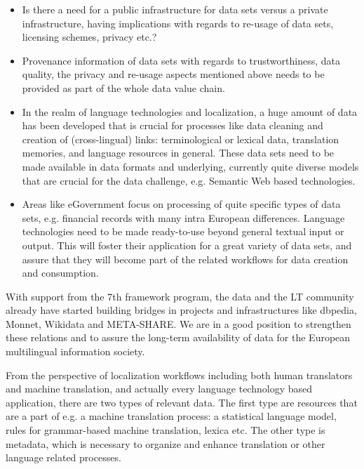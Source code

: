 \documentclass[10pt, plain]{../../metanetpaper}
\begin{document}
\begin{multicols}{2}
\begin{itemize}
\item Is there a need for a public infrastructure for data sets versus a private infrastructure, having implications with regards to re-usage of data sets, licensing schemes, privacy etc.?
\item Provenance information of data sets with regards to trustworthiness, data quality, the privacy and re-usage aspects mentioned above needs to be provided as part of the whole data value chain.
\item In the realm of language technologies and localization, a huge amount of data has been developed that is crucial for processes like data cleaning and creation of (cross-lingual) links: terminological or lexical data, translation memories, and language resources in general. These data sets need to be made available in data formats and underlying, currently quite diverse models that are crucial for the data challenge, e.g. Semantic Web based technologies.
\item Areas like eGovernment focus on processing of quite specific types of data sets, e.g. financial records with many intra European differences. Language technologies need to be made ready-to-use beyond general textual input or output. This will foster their application for a great variety of data sets, and assure that they will become part of the related workflows for data creation and consumption.
\end{itemize}

With support from the 7th framework program, the data and the LT community already have started building bridges in projects and infrastructures like dbpedia, Monnet, Wikidata and META-SHARE. We are in a good position to strengthen these relations and to assure the long-term availability of data for the European multilingual information society.


From the perspective of localization workflows including both human translators and machine translation, and actually every language technology based application, there are two types of relevant data. The first type are resources that are a part of e.g. a machine translation process: a statistical language model, rules for grammar-based machine translation, lexica etc. The other type is metadata, which is necessary to organize and enhance translation or other language related processes.


\end{multicols}
\end{document}
